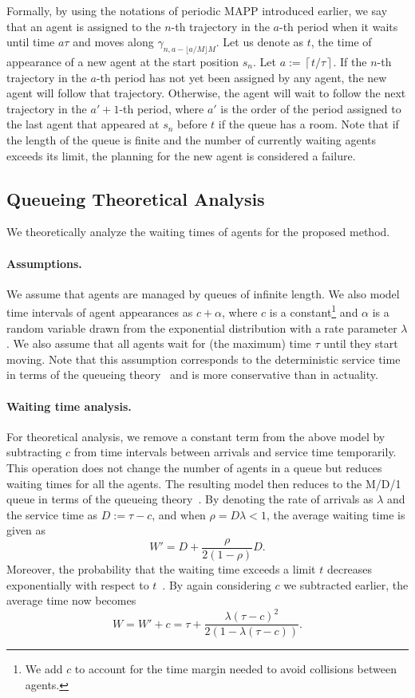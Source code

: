 \documentclass[letterpaper]{article} %
\begin{document}
Formally, by using the notations of periodic MAPP introduced earlier, we say that an agent is assigned to the $n$-th trajectory in the $a$-th period when it waits until time $a\tau$ and moves along $\gamma_{n,a-\lfloor a/M \rfloor M}$. Let us denote as $t$, the time of appearance of a new agent at the start position $s_n$. Let $a:=\left\lceil t/\tau \right\rceil$. If the $n$-th trajectory in the $a$-th period has not yet been assigned by any agent, the new agent will follow that trajectory. Otherwise, the agent will wait to follow the next trajectory in the $a'+1$-th period, where $a'$ is the order of the period assigned to the last agent that appeared at $s_n$ before $t$ if the queue has a room. Note that if the length of the queue is finite and the number of currently waiting agents exceeds its limit, the planning for the new agent is considered a failure.

\subsection{Queueing Theoretical Analysis}
We theoretically analyze the waiting times of agents for the proposed method. 

\paragraph{Assumptions.} We assume that agents are managed by queues of infinite length. We also model time intervals of agent appearances as $c+\alpha$, where $c$ is a constant\footnote{We add $c$ to account for the time margin needed to avoid collisions between agents.} and $\alpha$ is a random variable drawn from the exponential distribution with a rate parameter $\lambda$. We also assume that all agents wait for (the maximum) time $\tau$ until they start moving. Note that this assumption corresponds to the deterministic service time in terms of the queueing theory~\cite{kendall1953stochastic} and is more conservative than in actuality.

\paragraph{Waiting time analysis.}
For theoretical analysis, we remove a constant term from the above model by subtracting $c$ from time intervals between arrivals and service time temporarily. This operation does not change the number of agents in a queue but reduces waiting times for all the agents.
The resulting model then reduces to the M/D/1 queue in terms of the queueing theory~\cite{kendall1953stochastic}. By denoting the rate of arrivals as $\lambda$ and the service time as $D:=\tau-c$, and when $\rho = D\lambda < 1$, the average waiting time is given as
\begin{equation}
W'=D+\frac{\rho}{2(1-\rho)}D.
\end{equation}
Moreover, the probability that the waiting time exceeds a limit $t$ decreases exponentially with respect to $t$~\cite{erlang1909theory}. 
By again considering $c$ we subtracted earlier, the average time now becomes
\begin{equation}
W=W'+c=\tau+\frac{\lambda (\tau-c)^2}{2(1-\lambda (\tau-c))}.
\end{equation}
\end{document}
